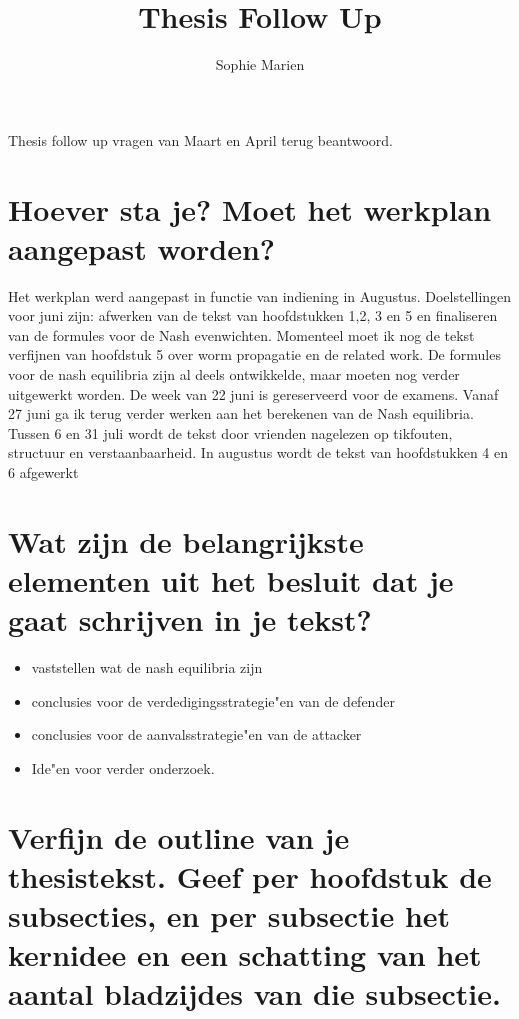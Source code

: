 \documentclass[a4paper, 11pt]{article}
\begin{document}
\begin{titlepage}
\title{Thesis Follow Up}
\author{Sophie Marien}
\date{} 
\end{titlepage}



\maketitle


Thesis follow up vragen van Maart en April terug beantwoord. 
\section{Hoever sta je? Moet het werkplan aangepast worden?}
Het werkplan werd aangepast in functie van indiening in Augustus. Doelstellingen voor juni zijn: afwerken van de tekst van hoofdstukken 1,2, 3 en 5 en finaliseren van de formules voor de Nash evenwichten.  Momenteel moet ik nog de tekst verfijnen van hoofdstuk 5 over worm propagatie en de related work. De formules voor de nash equilibria zijn al deels ontwikkelde, maar moeten nog verder uitgewerkt worden. De week van 22 juni is gereserveerd voor de examens. Vanaf 27 juni ga ik terug verder werken aan het berekenen van de Nash equilibria.  Tussen 6 en 31 juli wordt de tekst door vrienden nagelezen op tikfouten, structuur en verstaanbaarheid. In augustus wordt de tekst van hoofdstukken 4 en 6 afgewerkt 
\section{Wat zijn de belangrijkste elementen uit het besluit dat je gaat schrijven in je tekst?}
\begin{itemize}
\item vaststellen wat de nash equilibria zijn
\item conclusies voor de verdedigingsstrategie"en van de defender
\item conclusies voor de aanvalsstrategie"en van de attacker
\item Ide"en voor verder onderzoek. 
\end{itemize}

\section{Verfijn de outline van je thesistekst. Geef per hoofdstuk de subsecties, en per subsectie het kernidee en een schatting van het aantal bladzijdes van die subsectie.}
\end{document}
